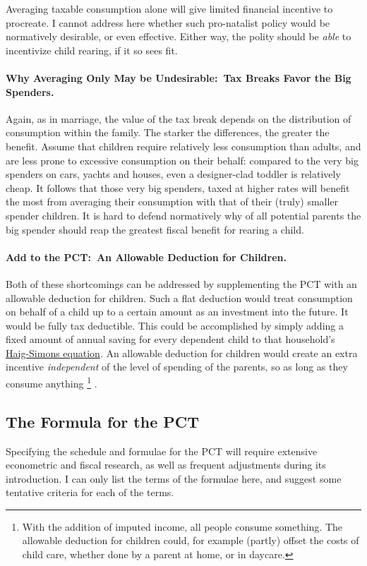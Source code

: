 Averaging taxable consumption alone will give limited financial incentive to procreate.
I cannot address here whether such pro-natalist policy would be normatively desirable, or even effective.
Either way, the polity should be \emph{able} to incentivize child rearing, if it so sees fit.

\paragraph{Why Averaging Only May be Undesirable:~Tax Breaks Favor the Big Spenders.}
Again, as in marriage, the value of the tax break depends on the distribution of consumption within the family.
The starker the differences, the greater the benefit.
Assume that children require relatively less consumption than adults, and are less prone to excessive consumption on their behalf:
compared to the very big spenders on cars, yachts and houses, even a designer-clad toddler is relatively cheap.
It follows that those very big spenders, taxed at higher rates will benefit the most from averaging their consumption with that of their (truly) smaller spender children.
It is hard to defend normatively why of all potential parents the big spender should reap the greatest fiscal benefit for rearing a child.

\paragraph{Add to the PCT:~An Allowable Deduction for Children.}
Both of these shortcomings can be addressed by supplementing the PCT with an allowable deduction for children.
Such a flat deduction would treat consumption on behalf of a child up to a certain amount as an investment into the future.
It would be fully tax deductible.
This could be accomplished by simply adding a fixed amount of annual saving for every dependent child to that household's \hyperref[eq:Haig-Simons]{Haig-Simons equation}.
An allowable deduction for children would create an extra incentive \emph{independent} of the level of spending of the parents, so as long as they consume anything
\footnote{
	With the addition of imputed income, all people consume something.
	The allowable deduction for children could, for example (partly) offset the costs of child care, whether done by a parent at home, or in daycare.
}
.

\subsection{The Formula for the PCT}
Specifying the schedule and formulae for the PCT will require extensive econometric and fiscal research, as well as frequent adjustments during its introduction.
I can only list the terms of the formulae here, and suggest some tentative criteria for each of the terms.

